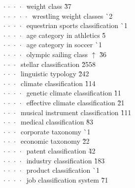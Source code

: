\begin{tabbing}
$\cdot\:\cdot\:\cdot\:\cdot\:$  weight class  \` 3{\raisebox{.4\height}{\scalebox{.6}{+}}}7\\
$\cdot\:\cdot\:\cdot\:\cdot\:\cdot\:$  wrestling weight classes  \` {\raisebox{.4\height}{\scalebox{.6}{+}}}2\\
$\cdot\:\cdot\:\cdot\:\cdot\:$  equestrian sports classification  \` {\raisebox{.4\height}{\scalebox{.6}{+}}}1\\
$\cdot\:\cdot\:\cdot\:\cdot\:$  age category in athletics  \` 5\\
$\cdot\:\cdot\:\cdot\:\cdot\:$  age category in soccer  \` {\raisebox{.4\height}{\scalebox{.6}{+}}}1\\
$\cdot\:\cdot\:\cdot\:\cdot\:$  olympic sailing class $\uparrow$ \` 3{\raisebox{.4\height}{\scalebox{.6}{+}}}6\\
$\cdot\:\cdot\:\cdot\:$  stellar classification  \` 25{\raisebox{.4\height}{\scalebox{.6}{+}}}58\\
$\cdot\:\cdot\:\cdot\:$  linguistic typology  \` 2{\raisebox{.4\height}{\scalebox{.6}{+}}}42\\
$\cdot\:\cdot\:\cdot\:$  climate classification  \` 1{\raisebox{.4\height}{\scalebox{.6}{+}}}14\\
$\cdot\:\cdot\:\cdot\:\cdot\:$  genetic climate classification  \` 1{\raisebox{.4\height}{\scalebox{.6}{+}}}1\\
$\cdot\:\cdot\:\cdot\:\cdot\:$  effective climate classification  \` 2{\raisebox{.4\height}{\scalebox{.6}{+}}}1\\
$\cdot\:\cdot\:\cdot\:$  musical instrument classification  \` 1{\raisebox{.4\height}{\scalebox{.6}{+}}}11\\
$\cdot\:\cdot\:\cdot\:$  medical classification  \` 8{\raisebox{.4\height}{\scalebox{.6}{+}}}3\\
$\cdot\:\cdot\:\cdot\:$  corporate taxonomy  \` {\raisebox{.4\height}{\scalebox{.6}{+}}}1\\
$\cdot\:\cdot\:\cdot\:$  economic taxonomy  \` 2{\raisebox{.4\height}{\scalebox{.6}{+}}}2\\
$\cdot\:\cdot\:\cdot\:\cdot\:$  patent classification  \` 4{\raisebox{.4\height}{\scalebox{.6}{+}}}2\\
$\cdot\:\cdot\:\cdot\:\cdot\:$  industry classification  \` 18{\raisebox{.4\height}{\scalebox{.6}{+}}}3\\
$\cdot\:\cdot\:\cdot\:\cdot\:$  product classification  \` {\raisebox{.4\height}{\scalebox{.6}{+}}}1\\
$\cdot\:\cdot\:\cdot\:\cdot\:$  job classification system  \` 7{\raisebox{.4\height}{\scalebox{.6}{+}}}1\\

\end{tabbing}
